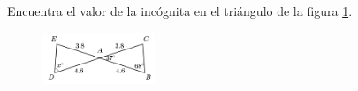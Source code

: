 \question[10]  Encuentra el valor de la incógnita en el triángulo de la figura \ref{fig:angle_triangle_13}.
\begin{figure}[H]
    \begin{center}
        \includegraphics[width=0.3\textwidth]{../images/angle_triangle_13.png}
    \end{center}
    \caption{}
    \label{fig:angle_triangle_13}
\end{figure}